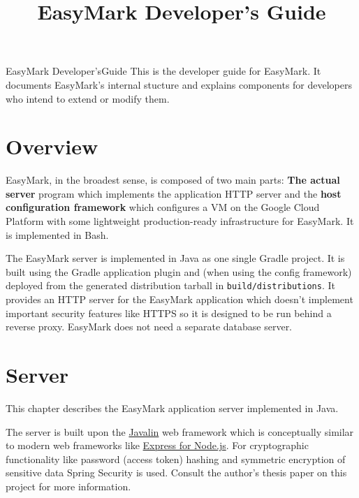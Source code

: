 \documentclass[12pt,a4paper]{report}
\title{EasyMark Developer's Guide}
\begin{document}
	\vspace*{.35\textheight}
	\fontsize{48pt}{48pt}
	\selectfont
	\tabto{230pt}
	E\hfill{}a\hfill{}s\hfill{}y\hfill{}M\hfill{}a\hfill{}r\hfill{}k
	\linebreak
	\vskip-35pt
	\fontsize{25pt}{25pt}
	\selectfont
	\tabto{232pt}
	D\hfill{}e\hfill{}v\hfill{}e\hfill{}l\hfill{}o\hfill{}p\hfill{}e\hfill{}r\hfill{}'\hfill{}s\space\space\hfill{}G\hfill{}u\hfill{}i\hfill{}d\hfill{}e
	\linebreak
	\normalsize
	\vfill
	\large
	This is the developer guide for EasyMark. It documents EasyMark's internal stucture and explains components for developers who intend to extend or modify them.
	\normalsize
	\pagebreak
	\tableofcontents
	\clearpage
	\chapter{Overview}
	EasyMark, in the broadest sense, is composed of two main parts: \textbf{The actual server} program which implements the application HTTP server and the \textbf{host configuration framework} which configures a VM on the Google Cloud Platform with some lightweight production-ready infrastructure for EasyMark. It is implemented in Bash.

	The EasyMark server is implemented in Java as one single Gradle project. It is built using the Gradle application plugin and (when using the config framework) deployed from the generated distribution tarball in \lstinline|build/distributions|. It provides an HTTP server for the EasyMark application which doesn't implement important security features like HTTPS so it is designed to be run behind a reverse proxy. EasyMark does not need a separate database server.

	\chapter{Server}
	This chapter describes the EasyMark application server implemented in Java.

	The server is built upon the \href{https://javalin.io/}{Javalin} web framework which is conceptually similar to modern web frameworks like \href{https://expressjs.com/}{Express for Node.js}. For cryptographic functionality like password (access token) hashing and symmetric encryption of sensitive data Spring Security is used. Consult the author's thesis paper on this project for more information.
\end{document}
